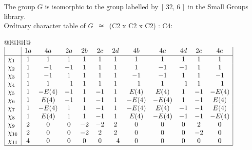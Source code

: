 \documentclass[varwidth=\maxdimen,border=10]{standalone}
\begin{document}
The group $G$ is isomorphic to the group labelled by\ [ 32, 6 ]\ in the Small Groups library.\\
Ordinary character table of $G$\ $\cong$\ (C2 x C2 x C2) : C4:\\
\begin{center}
\begin{tabular}{@{}l@{}l@{}l@{}}
\hline
\(\begin{array}{|l|ccccccccccc|}
  & 1a & 4a & 2a & 2b & 2c & 2d & 4b & 4c & 4d & 2e & 4e\\ \hline
\chi_{1} & 1 & 1 & 1 & 1 & 1 & 1 & 1 & 1 & 1 & 1 & 1\\
\chi_{2} & 1 & -1 & -1 & 1 & 1 & 1 & 1 & -1 & -1 & 1 & 1\\
\chi_{3} & 1 & -1 & 1 & 1 & 1 & 1 & -1 & -1 & 1 & 1 & -1\\
\chi_{4} & 1 & 1 & -1 & 1 & 1 & 1 & -1 & 1 & -1 & 1 & -1\\
\chi_{5} & 1 & -E(4) & -1 & 1 & -1 & 1 & E(4) & E(4) & 1 & -1 & -E(4)\\
\chi_{6} & 1 & E(4) & -1 & 1 & -1 & 1 & -E(4) & -E(4) & 1 & -1 & E(4)\\
\chi_{7} & 1 & -E(4) & 1 & 1 & -1 & 1 & -E(4) & E(4) & -1 & -1 & E(4)\\
\chi_{8} & 1 & E(4) & 1 & 1 & -1 & 1 & E(4) & -E(4) & -1 & -1 & -E(4)\\
\chi_{9} & 2 & 0 & 0 & -2 & -2 & 2 & 0 & 0 & 0 & 2 & 0\\
\chi_{10} & 2 & 0 & 0 & -2 & 2 & 2 & 0 & 0 & 0 & -2 & 0\\
\chi_{11} & 4 & 0 & 0 & 0 & 0 & -4 & 0 & 0 & 0 & 0 & 0\\
\hline
\end{array}\)\\
\end{tabular}
\end{center}
\end{document}
